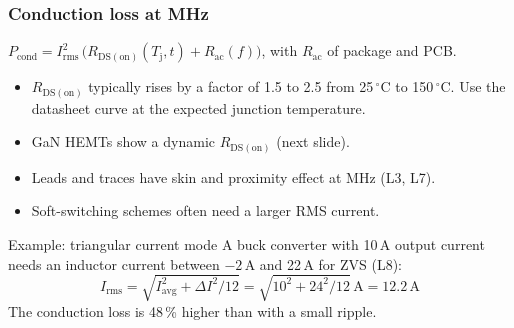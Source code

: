 \begin{frame}
	\frametitle{Conduction loss at MHz}
	$P_\mathrm{cond}=I_\mathrm{rms}^2\,\big(R_\mathrm{DS(on)}(T_\mathrm{j},t)+R_\mathrm{ac}(f)\big)$, with $R_\mathrm{ac}$ of package and PCB.
	\begin{itemize}
		\item $R_\mathrm{DS(on)}$ typically rises by a factor of 1.5 to 2.5 from 25\,$^\circ$C to 150\,$^\circ$C. Use the datasheet curve at the expected junction temperature.
		\item GaN HEMTs show a dynamic $R_\mathrm{DS(on)}$ (next slide).
		\item Leads and traces have skin and proximity effect at MHz (L3, L7).
		\item Soft-switching schemes often need a larger RMS current.
	\end{itemize}
	\begin{block}{Example: triangular current mode}
		A buck converter with 10\,A output current needs an inductor current between $-2$\,A and 22\,A for ZVS (L8):
		\begin{equation*}
			I_\mathrm{rms}=\sqrt{I_\mathrm{avg}^2+\Delta I^2/12}=\sqrt{10^2+24^2/12}\,\mathrm{A}=12.2\,\mathrm{A}
		\end{equation*}
		The conduction loss is 48\,\% higher than with a small ripple.
	\end{block}
\end{frame}

